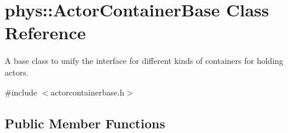\hypertarget{classphys_1_1ActorContainerBase}{
\section{phys::ActorContainerBase Class Reference}
\label{d1/d00/classphys_1_1ActorContainerBase}
}


A base class to unify the interface for different kinds of containers for holding actors.  




{\ttfamily \#include $<$actorcontainerbase.h$>$}

\subsection*{Public Member Functions}

